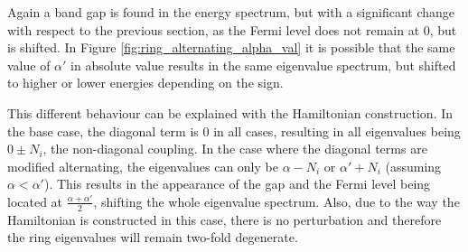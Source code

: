 \documentclass[twocolumn]{article}
\begin{document}
Again a band gap is found in the energy spectrum, but with a significant change with respect to the previous section, as the Fermi level does not remain at $0$, but is shifted. In Figure \ref{fig:ring_alternating_alpha_val} it is possible that the same value of $\alpha'$ in absolute value results in the same eigenvalue spectrum, but shifted to higher or lower energies depending on the sign. 

This different behaviour can be explained with the Hamiltonian construction. In the base case, the diagonal term is $0$ in all cases, resulting in all eigenvalues being $0 \pm N_i$, the non-diagonal coupling. In the case where the diagonal terms are modified alternating, the eigenvalues can only be  $\alpha-N_i$ or $\alpha'+N_i$ (assuming $\alpha < \alpha'$). This results in the appearance of the gap and the Fermi level being located at $\frac{\alpha + \alpha'}{2}$, shifting the whole eigenvalue spectrum. Also, due to the way the Hamiltonian is constructed in this case, there is no perturbation and therefore the ring eigenvalues will remain two-fold degenerate. 
\end{document}
